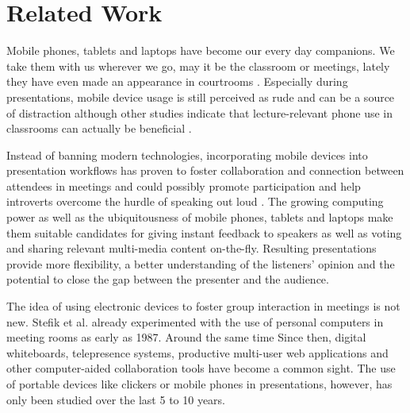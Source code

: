 \chapter{Related Work}
\label{cha:related-work}

Mobile phones, tablets and laptops have become our every day companions. We take them with us wherever we go, may it be the classroom or meetings, lately they have even made an appearance in courtrooms \cite{Farrell:TrialByTablet}. Especially during presentations, mobile device usage is still perceived as rude and can be a source of distraction \cite{Bohmer:SmartphoneUseRude, Bajko:ComparativePerceptionSmartphoneMeeting, Kuznekoff:ImpactPhoneStudentLearning} although other studies indicate that lecture-relevant phone use in classrooms can actually be beneficial \cite{Kuznekoff:MobilePhoneClassroomTwitter}.

Instead of banning modern technologies, incorporating mobile devices into presentation workflows has proven to foster collaboration and connection between attendees in meetings \cite{Bohmer:SmartphoneUseRude} and could possibly promote participation and help introverts overcome the hurdle of speaking out loud \cite{Bry:Backstage}. The growing computing power as well as the ubiquitousness of mobile phones, tablets and laptops make them suitable candidates for giving instant feedback to speakers as well as voting and sharing relevant multi-media content on-the-fly. Resulting presentations provide more flexibility, a better understanding of the listeners' opinion and the potential to close the gap between the presenter and the audience.

The idea of using electronic devices to foster group interaction in meetings is not new. Stefik et al. \cite{Stefik:BeyondTheChalkboard} already experimented with the use of personal computers in meeting rooms as early as 1987. Around the same time 
 Since then, digital whiteboards, telepresence systems, productive multi-user web applications and other computer-aided collaboration tools have become a common sight. The use of portable devices like clickers or mobile phones in presentations, however, has only been studied over the last 5 to 10 years.

